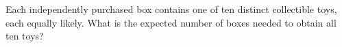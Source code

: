 Each independently purchased box contains one of ten distinct collectible toys, each equally likely. What is the expected number of boxes needed to obtain all ten toys?
